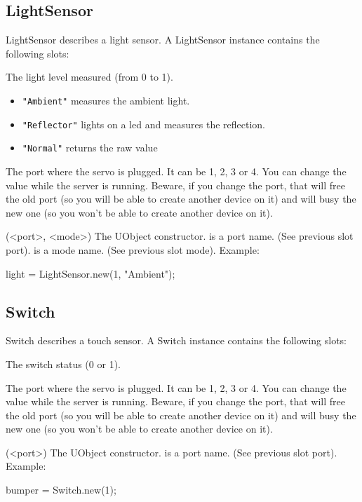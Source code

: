 \subsection{LightSensor}

LightSensor describes a light sensor. A LightSensor instance contains the
following slots:

\begin{urbiscriptapi}
\item[val] The light level measured (from 0 to 1).

\item[mode]
  \begin{itemize}
  \item \lstinline{"Ambient"} measures the ambient light.
  \item \lstinline{"Reflector"} lights on a led and measures the reflection.
  \item \lstinline{"Normal"} returns the raw value
  \end{itemize}

\item[port] The port where the servo is plugged. It can be 1, 2, 3 or 4. You
  can change the value while the server is running. Beware, if you change
  the port, that will free the old port (so you will be able to create
  another device on it) and will busy the new one (so you won't be able to
  create another device on it).

\item[init](<port>, <mode>) The UObject constructor.  is a port
  name. (See previous slot port).  is a mode name. (See previous
  slot mode). Example:
\begin{urbiunchecked}
light = LightSensor.new(1, "Ambient");
\end{urbiunchecked}
\end{urbiscriptapi}

\subsection{Switch}

Switch describes a touch sensor. A Switch instance contains the following
slots:

\begin{urbiscriptapi}
\item[val] The switch status (0 or 1).

\item[port] The port where the servo is plugged. It can be 1, 2, 3 or 4. You
  can change the value while the server is running. Beware, if you change
  the port, that will free the old port (so you will be able to create
  another device on it) and will busy the new one (so you won't be able to
  create another device on it).

\item[init](<port>) The UObject constructor.  is a port name. (See
  previous slot port). Example:
\begin{urbiunchecked}
bumper = Switch.new(1);
\end{urbiunchecked}

\end{urbiscriptapi}

